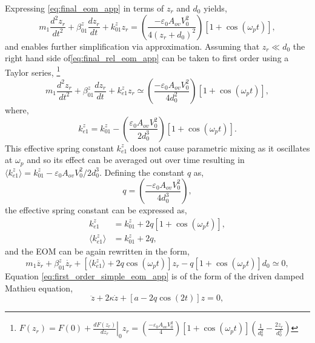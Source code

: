 \documentclass[12pt, a4paper, twoside]{book}
\begin{document}
Expressing \eqref{eq:final_eom_app} in terms of $z_r$ and $d_0$ yields,
\begin{equation}
	m_1 \frac{d^2z_r}{dt^2} + \beta_{01}^z \frac{dz_r}{dt} + k_{01}^zz_r = \left( \frac{-\varepsilon_0 A_{ov} V_0^2}{4(z_r+d_0)^2}\right)\left[1+\cos(\omega_pt)\right],
\label{eq:final_rel_eom_app}
\end{equation}
and enables further simplification via approximation. Assuming that $z_r \ll d_0$ the right hand side of\eqref{eq:final_rel_eom_app} can be taken to first order using a Taylor series,%
\footnote{$F(z_r) = F(0) + \left.\frac{dF(z_r)}{dz_r}\right\rvert_0 z_r = \left(\frac{-\varepsilon_0 A_{ov} V_0^2}{4}\right) [1+\cos(\omega_pt)] \left(\frac{1}{d_0^2} - \frac{2z_r}{d_0^3 }\right)$}
%
\begin{equation}
m_1 \frac{d^2z_r}{dt^2} + \beta_{01}^z \frac{dz_r}{dt} + k_{e1}^zz_r \simeq \left(\frac{-\varepsilon_0 A_{ov} V_0^2}{4d_0^2}\right) \left[1+\cos(\omega_pt)\right],
\label{eq:first_order_eom_app}
\end{equation}
%
where,
%
\begin{equation}
k_{e1}^z = k_{01}^z - \left(\frac{\varepsilon_0 A_{ov} V_0^2}{2d_0^3}\right) \left[1+\cos(\omega_pt)\right].
\end{equation}
This effective spring constant $k_{e1}^z$ does not cause parametric mixing as it oscillates at $\omega_p$ and so its effect can be averaged out over time resulting in $\langle k_{e1}^{z} \rangle = k_{01}^z - {\varepsilon_0 A_{ov} V_0^2}/{2d_0^3}$. Defining the constant $q$ as,
\begin{equation} q = \left(\frac{-\varepsilon_0 A_{ov} V_0^2}{4d_0^3}\right), \end{equation}
the effective spring constant can be expressed as,
\begin{align}
k_{e1}^z &= k_{01}^z + 2q \left[1+\cos(\omega_pt)\right],\\
\langle k_{e1}^{z} \rangle &= k_{01}^z + 2q,
\end{align}
and the EOM can be again rewritten in the form,
\begin{equation}
m_1\ddot{z_r} + \beta_{01}^z\dot{z_r} + \left[\langle k_{e1}^z\rangle + 2q\cos(\omega_pt)\right]z_r - q\left[1+\cos(\omega_pt)\right]d_0 \simeq 0,
\label{eq:first_order_simple_eom_app}
\end{equation}
Equation \eqref{eq:first_order_simple_eom_app} is of the form of the driven damped Mathieu equation,
\begin{equation} \ddot{z} + 2\kappa\dot{z} + [a - 2q\cos(2t)]z = 0, \end{equation}
\end{document}
